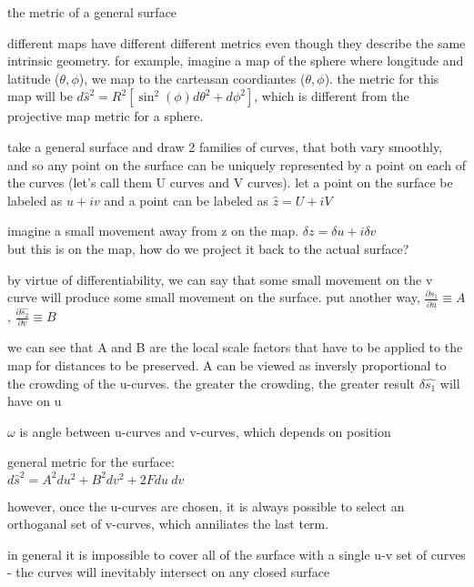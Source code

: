 \documentclass{article}
\newenvironment{andrew_section}[1]
    {
    \section{#1}
    \begin{itemize}
    }
    {
    \end{itemize}
    }
\begin{document}
\begin{andrew_section}{the metric of a general surface}
    \item 
        different maps have different different metrics even though
        they describe the same intrinsic geometry.  for example,
        imagine a map of the sphere where longitude and latitude 
        ($\theta,\phi$), we map to the carteasan coordiantes
        ($\theta,\phi$).  the metric for this map will be
        $ d \hat{s}^2  = R^2[\sin^2 (\phi) d\theta^2 + d \phi^2]$,
        which is different from the projective map metric for a sphere.
    \item 
        take a general surface and draw 2 families of curves, that both
        vary smoothly, and so any point on the surface can be uniquely represented
        by a point on each of the curves (let's call them U curves and V curves).
        let a point on the surface be labeled as $u + i v$ and a point can
        be labeled as $\hat{z} = U + i V$
    \item 
        imagine a small movement away from z on the map.  
        $\delta z = \delta u + i \delta v$ \\
        but this is on the map, how do we project it back to the actual
        surface? 
    \item by virtue of differentiability, we can say that some small movement
        on the v curve will produce some small movement on the surface.
        put another way, $\frac{\partial \hat{s_1}}{\partial u} \equiv A$,
        $\frac{\partial \hat{s_2}}{\partial v} \equiv B$
    \item 
        we can see that A and B are the local scale factors that have to be
        applied to the map for distances to be preserved.  A can be viewed
        as inversly proportional to the crowding of the u-curves.  the greater
        the crowding, the greater result $\delta \hat{s_1}$ will have on u
    \item 
        $\omega$ is angle between u-curves and v-curves, which depends on
        position
    \item 
        general metric for the surface: \\
        $d \hat{s}^2 = A^2 du^2 + B^2 dv^2 + 2Fdu \ dv$
    \item 
        however, once the u-curves are chosen, it is always possible
        to select an orthoganal set of v-curves, which anniliates the
        last term.
    \item 
        in general it is impossible to cover all of the surface with
        a single u-v set of curves - the curves will inevitably intersect on
        any closed surface 
\end{andrew_section}
\end{document}
